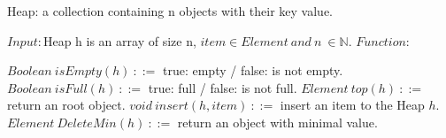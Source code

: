 \documentclass[10pt]{article}
\begin{document}
\begin{algorithm}[H]
\renewcommand{\thealgorithm}{}

\caption{Heap: a collection containing n objects with their key value.}
\label{protocol1}
\begin{algorithmic}
\STATE $Input :$\quad Heap h is an array of size n, $item \in Element\ and\ n\ \in \mathbb{N}.$
\STATE 
\STATE $Function :$ 

\STATE \qquad\qquad $Boolean\ isEmpty(h)\ ::=$ true: empty / false: is not empty.
\STATE \qquad\qquad $Boolean\ isFull(h)\ ::=$ true: full / false: is not full.
\STATE \qquad\qquad $Element\ top(h)\ ::=$ return an root object.
\STATE \qquad\qquad $void\ insert(h, item)\ ::=$ insert an item to the Heap $h$.
\STATE \qquad\qquad $Element\ DeleteMin(h)\ ::=$ return an object with minimal value.

\end{algorithmic}
\end{algorithm} 
\end{document}
